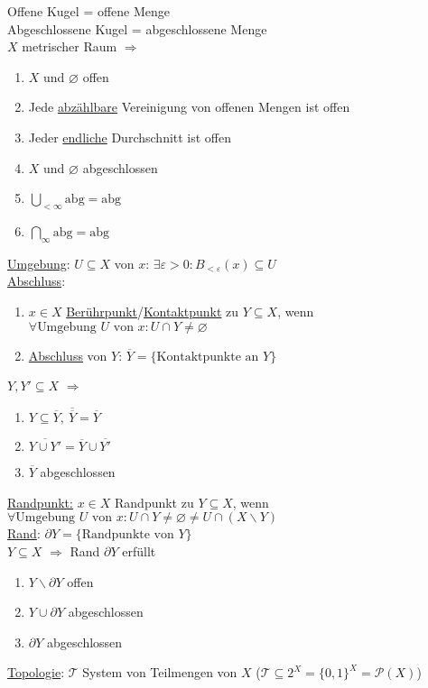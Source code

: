 \documentclass[a4paper]{article}
\newcommand{\ul}{\underline}
\let\epsilon\varepsilon
\begin{document}
Offene Kugel = offene Menge\\
Abgeschlossene Kugel = abgeschlossene Menge\\
$X$ metrischer Raum $\Rightarrow$
\begin{enumerate}[1)]
	\item $X$ und $\varnothing$ offen
	\item Jede \ul{abzählbare} Vereinigung von offenen Mengen ist offen
	\item Jeder \ul{endliche} Durchschnitt ist offen
	\item $X$ und $\varnothing$ abgeschlossen
	\item $\bigcup_{<\infty}\text{abg}=\text{abg}$
	\item $\bigcap_{\infty}\text{abg}=\text{abg}$
\end{enumerate}
\ul{Umgebung}: $U\subseteq X$ von $x$: $\exists\epsilon>0:B_{<\epsilon}(x)\subseteq U$\\
\ul{Abschluss}:
\begin{enumerate}[1)]
	\item $x\in X$ \ul{Berührpunkt}/\ul{Kontaktpunkt} zu $Y\subseteq X$, wenn $\forall \text{Umgebung }U\text{ von }x:U\cap Y\neq\varnothing$
	\item \ul{Abschluss} von $Y$: $\overline{Y}=\{\text{Kontaktpunkte an }Y\}$
\end{enumerate}
$Y,Y'\subseteq X$ $\Rightarrow$
\begin{enumerate}[1)]
	\item $Y\subseteq\overline{Y},\ \overline{\overline{Y}}=\overline{Y}$
	\item $\overline{Y\cup Y'}=\overline{Y}\cup\overline{Y'}$
	\item $\overline{Y}$ abgeschlossen
\end{enumerate}
\ul{Randpunkt:} $x\in X$ Randpunkt zu $Y\subseteq X$, wenn $\forall \text{Umgebung }U\text{ von }x:U\cap Y\neq\varnothing\neq U\cap(X\backslash Y)$\\
\ul{Rand}: $\partial Y=\{\text{Randpunkte von }Y\}$\\
$Y\subseteq X$ $\Rightarrow$ Rand $\partial Y$ erfüllt
\begin{enumerate}[1)]
	\item $Y\backslash\partial Y$ offen
	\item $Y\cup\partial Y$ abgeschlossen
	\item $\partial Y$ abgeschlossen
\end{enumerate}
\ul{Topologie}: $\mathcal{T}$ System von Teilmengen von $X$ ($\mathcal{T}\subseteq 2^X=\{0,1\}^X=\mathcal{P}(X)$)\\
\end{document}
